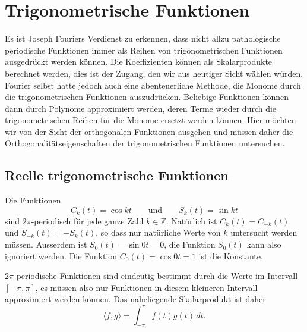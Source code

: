 %
%
%
\section{Trigonometrische Funktionen
\label{buch:orthofkt:section:trigo}}
Es ist Joseph Fouriers Verdienst zu erkennen, dass nicht allzu pathologische
periodische Funktionen immer als Reihen von trigonometrischen
Funktionen ausgedrückt werden können.
Die Koeffizienten können als Skalarprodukte berechnet werden,
dies ist der Zugang, den wir aus heutiger Sicht wählen würden.
Fourier selbst hatte jedoch auch eine abenteuerliche Methode,
die Monome durch die trigonometrischen Funktionen auszudrücken.
Beliebige Funktionen können dann durch Polynome approximiert
werden, deren Terme wieder durch die trigonometrischen Reihen
für die Monome ersetzt werden können.
Hier möchten wir von der Sicht der orthogonalen Funktionen ausgehen
und müssen daher die Orthogonalitätseigenschaften der trigonometrischen
Funktionen untersuchen.

%
%
\subsection{Reelle trigonometrische Funktionen}
Die Funktionen
\[
C_k(t) = \cos kt
\qquad\text{und}\qquad
S_k(t) = \sin kt
\]
sind $2\pi$-periodisch für jede ganze Zahl $k\in\mathbb{Z}$.
Natürlich ist $C_k(t)=C_{-k}(t)$ und $S_{-k}(t)=-S_k(t)$, so
dass nur natürliche Werte von $k$ untersucht werden müssen.
Ausserdem ist $S_0(t)=\sin 0t=0$,
die Funktion $S_0(t)$ kann also ignoriert werden.
Die Funktion $C_0(t)=\cos 0t=1$ ist die Konstante.

$2\pi$-periodische Funktionen sind eindeutig bestimmt durch die
Werte im Intervall $[-\pi,\pi]$, es müssen also nur Funktionen in
diesem kleineren Intervall approximiert werden können.
Das naheliegende Skalarprodukt ist daher
\[
\langle f,g\rangle
=
\int_{-\pi}^\pi f(t)g(t)\,dt.
\]

%
%
